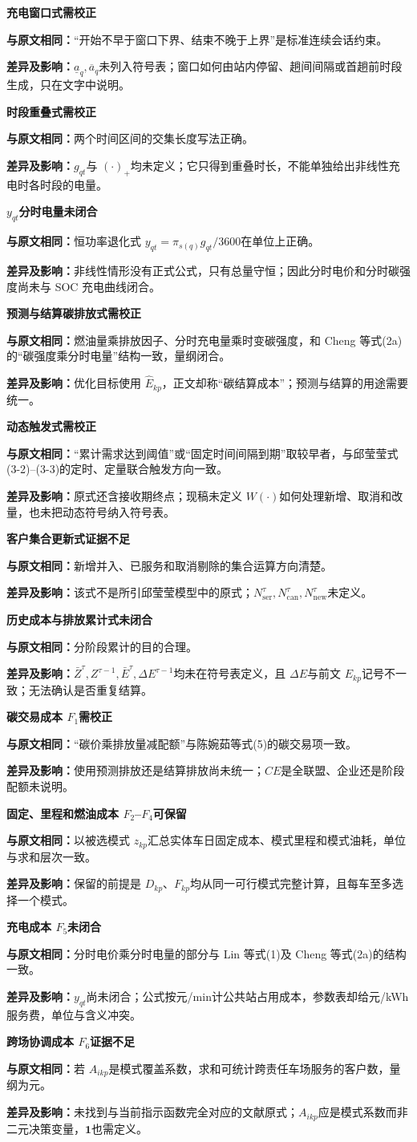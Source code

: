 \documentclass[UTF8,11pt,a4paper,fontset=none]{ctexart}
\newcommand{\pass}{\textcolor{okgreen}{\textbf{可保留}}}
\newcommand{\revise}{\textcolor{warnorange}{\textbf{需校正}}}
\newcommand{\fail}{\textcolor{badred}{\textbf{未闭合}}}
\newcommand{\unknown}{\textbf{证据不足}}
\newcommand{\audititem}[4]{%
  \noindent\textbf{#1}\hfill #2\par
  \noindent\textbf{与原文相同：}#3\par
  \noindent\textbf{差异及影响：}#4\par\medskip
}
\begin{document}
\audititem{充电窗口式}{\revise}
{“开始不早于窗口下界、结束不晚于上界”是标准连续会话约束。}
{$\underline a_q,\overline a_q$未列入符号表；窗口如何由站内停留、趟间间隔或首趟前时段生成，只在文字中说明。}

\audititem{时段重叠式}{\revise}
{两个时间区间的交集长度写法正确。}
{$g_{qt}$与 $(\cdot)_+$均未定义；它只得到重叠时长，不能单独给出非线性充电时各时段的电量。}

\audititem{$y_{qt}$分时电量}{\fail}
{恒功率退化式 $y_{qt}=\pi_{s(q)}g_{qt}/3600$在单位上正确。}
{非线性情形没有正式公式，只有总量守恒；因此分时电价和分时碳强度尚未与 SOC 充电曲线闭合。}

\audititem{预测与结算碳排放式}{\revise}
{燃油量乘排放因子、分时充电量乘时变碳强度，和 Cheng 等式(2a)的“碳强度乘分时电量”结构一致，量纲闭合。}
{优化目标使用 $\widehat E_{kp}$，正文却称“碳结算成本”；预测与结算的用途需要统一。}

\audititem{动态触发式}{\revise}
{“累计需求达到阈值”或“固定时间间隔到期”取较早者，与邱莹莹式(3-2)--(3-3)的定时、定量联合触发方向一致。}
{原式还含接收期终点；现稿未定义 $W(\cdot)$如何处理新增、取消和改量，也未把动态符号纳入符号表。}

\audititem{客户集合更新式}{\unknown}
{新增并入、已服务和取消剔除的集合运算方向清楚。}
{该式不是所引邱莹莹模型中的原式；$N_{\mathrm{ser}}^\tau,N_{\mathrm{can}}^\tau,N_{\mathrm{new}}^\tau$未定义。}

\audititem{历史成本与排放累计式}{\fail}
{分阶段累计的目的合理。}
{$\bar Z^\tau,Z^{\tau-1},\bar E^\tau,\Delta E^{\tau-1}$均未在符号表定义，且 $\Delta E$与前文 $E_{kp}$记号不一致；无法确认是否重复结算。}

\audititem{碳交易成本 $F_1$}{\revise}
{“碳价乘排放量减配额”与陈婉茹等式(5)的碳交易项一致。}
{使用预测排放还是结算排放尚未统一；$CE$是全联盟、企业还是阶段配额未说明。}

\audititem{固定、里程和燃油成本 $F_2$--$F_4$}{\pass}
{以被选模式 $z_{kp}$汇总实体车日固定成本、模式里程和模式油耗，单位与求和层次一致。}
{保留的前提是 $D_{kp}$、$F_{kp}$均从同一可行模式完整计算，且每车至多选择一个模式。}

\audititem{充电成本 $F_5$}{\fail}
{分时电价乘分时电量的部分与 Lin 等式(1)及 Cheng 等式(2a)的结构一致。}
{$y_{qt}$尚未闭合；公式按元/min计公共站占用成本，参数表却给元/kWh服务费，单位与含义冲突。}

\audititem{跨场协调成本 $F_6$}{\unknown}
{若 $A_{ikp}$是模式覆盖系数，求和可统计跨责任车场服务的客户数，量纲为元。}
{未找到与当前指示函数完全对应的文献原式；$A_{ikp}$应是模式系数而非二元决策变量，$\mathbf 1$也需定义。}
\end{document}
